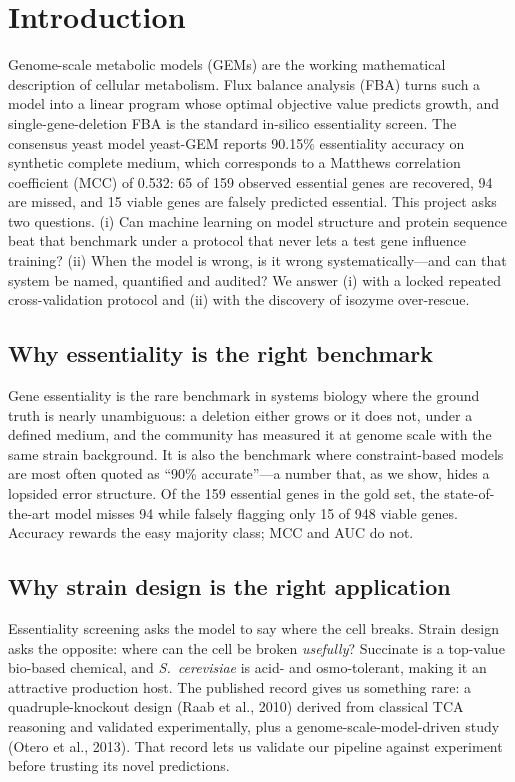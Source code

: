 \documentclass[12pt]{article}
\begin{document}
\section{Introduction}
Genome-scale metabolic models (GEMs) are the working mathematical
description of cellular metabolism. Flux balance analysis (FBA) turns such
a model into a linear program whose optimal objective value predicts
growth, and single-gene-deletion FBA is the standard in-silico
essentiality screen. The consensus yeast model yeast-GEM reports 90.15\%
essentiality accuracy on synthetic complete medium, which corresponds to a
Matthews correlation coefficient (MCC) of 0.532: 65 of 159 observed
essential genes are recovered, 94 are missed, and 15 viable genes are
falsely predicted essential. This project asks two questions. (i) Can
machine learning on model structure and protein sequence beat that
benchmark under a protocol that never lets a test gene influence training?
(ii) When the model is wrong, is it wrong systematically---and can that
system be named, quantified and audited? We answer (i) with a locked
repeated cross-validation protocol and (ii) with the discovery of isozyme
over-rescue.

\subsection{Why essentiality is the right benchmark}
Gene essentiality is the rare benchmark in systems biology where the ground
truth is nearly unambiguous: a deletion either grows or it does not, under a
defined medium, and the community has measured it at genome scale with the
same strain background. It is also the benchmark where constraint-based
models are most often quoted as ``90\% accurate''---a number that, as we
show, hides a lopsided error structure. Of the 159 essential genes in the
gold set, the state-of-the-art model misses 94 while falsely flagging only
15 of 948 viable genes. Accuracy rewards the easy majority class; MCC and
AUC do not.

\subsection{Why strain design is the right application}
Essentiality screening asks the model to say where the cell breaks. Strain
design asks the opposite: where can the cell be broken \emph{usefully}?
Succinate is a top-value bio-based chemical, and \emph{S.\ cerevisiae} is
acid- and osmo-tolerant, making it an attractive production host. The
published record gives us something rare: a quadruple-knockout design
(Raab et al., 2010) derived from classical TCA reasoning and validated
experimentally, plus a genome-scale-model-driven study (Otero et al.,
2013). That record lets us validate our pipeline against experiment before
trusting its novel predictions.
\end{document}
